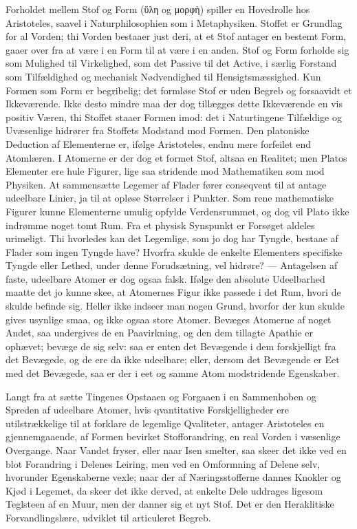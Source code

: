 \documentclass[12pt,a4paper]{book}
\begin{document}
Forholdet mellem Stof og Form (ὕλη og μορφὴ) spiller en Hovedrolle hos
Aristoteles, saavel i Naturphilosophien som i Metaphysiken. Stoffet er
Grundlag for al Vorden; thi Vorden bestaaer just deri, at et Stof antager en
bestemt Form, gaaer over fra at være i en Form til at være i en anden. Stof og
Form forholde sig som Mulighed til Virkelighed, som det Passive til det
Active, i særlig Forstand som Tilfældighed og mechanisk Nødvendighed til
Hensigtsmæssighed. Kun Formen som Form er begribelig; det formløse Stof er
uden Begreb og forsaavidt et Ikkeværende. Ikke desto mindre maa der dog
tillægges dette Ikkeværende en vis positiv Væren, thi Stoffet staaer Formen
imod: det i Naturtingene Tilfældige og Uvæsenlige hidrører fra Stoffets
Modstand mod Formen. Den platoniske Deduction af Elementerne er, ifølge
Aristoteles, endnu mere forfeilet end Atomlæren. I Atomerne er der dog et
formet Stof, altsaa en Realitet; men Platos Elementer ere hule Figurer, lige
saa stridende mod Mathematiken som mod Physiken. At sammensætte Legemer af
Flader fører conseqvent til at antage udeelbare Linier, ja til at opløse
Størrelser i Punkter. Som rene mathematiske Figurer kunne Elementerne umulig
opfylde Verdensrummet, og dog vil Plato ikke indrømme noget tomt Rum. Fra et
physisk Synspunkt er Forsøget aldeles urimeligt. Thi hvorledes kan det
Legemlige, som jo dog har Tyngde, bestaae af Flader som ingen Tyngde have?
Hvorfra skulde de enkelte Elementers specifiske Tyngde eller Lethed, under
denne Forudsætning, vel hidrøre? --- Antagelsen af faste, udeelbare Atomer er
dog ogsaa falsk. Ifølge den absolute Udeelbarhed maatte det jo kunne skee, at
Atomernes Figur ikke passede i det Rum, hvori de skulde befinde sig. Heller
ikke indseer man nogen Grund, hvorfor der kun skulde gives usynlige smaa, og
ikke ogsaa store Atomer. Bevæges Atomerne af noget Andet, saa undergives de en
Paavirkning, og den dem tillagte Apathie er ophævet;
bevæge de sig selv: saa er enten det Bevægende i dem forskjelligt fra det
Bevægede, og de ere da ikke udeelbare; eller, dersom det Bevægende er Eet med
det Bevægede, saa er der i eet og samme Atom modstridende Egenskaber.

Langt fra at sætte Tingenes Opstaaen og Forgaaen i en Sammenhoben og Spreden
af udeelbare Atomer, hvis qvantitative Forskjelligheder ere utilstrækkelige
til at forklare de legemlige Qvaliteter, antager Aristoteles en
gjennemgaaende, af Formen bevirket Stofforandring, en real Vorden i væsenlige
Overgange. Naar Vandet fryser, eller naar Isen smelter, saa skeer det ikke ved
en blot Forandring i Delenes Leiring, men ved en Omformning af Delene selv,
hvorunder Egenskaberne vexle; naar der af Næringsstofferne dannes Knokler og
Kjød i Legemet, da skeer det ikke derved, at enkelte Dele uddrages ligesom
Teglsteen af en Muur, men der danner sig et nyt Stof. Det er den Heraklitiske
Forvandlingslære, udviklet til articuleret Begreb.
\end{document}

